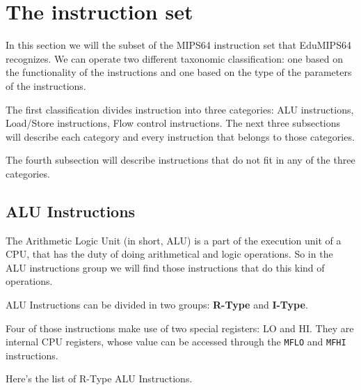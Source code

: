 \documentclass[12pt]{report}
\newcommand{\EM}{EduMIPS64}
\newcommand{\MS}{MIPS64}
\begin{document}
\chapter{The instruction set}
\label{instructions}

In this section we will the subset of the \MS{} instruction set that \EM{}
recognizes. We can operate two different taxonomic classification: one based on
the functionality of the instructions and one based on the type of the
parameters of the instructions. 


The first classification divides instruction into three categories:
ALU instructions, Load/Store instructions, Flow control instructions. The next
three subsections will describe each category and every instruction that belongs
to those categories.

The fourth subsection will describe instructions that do not fit in any of the
three categories.



\section{ALU Instructions}
The Arithmetic Logic Unit (in short, ALU) is a part of the execution unit of a
CPU, that has the duty of doing arithmetical and logic operations. So in the ALU
instructions group we will find those instructions that do this kind of
operations.

ALU Instructions can be divided in two groups: \textbf{R-Type} and
\textbf{I-Type}. 

Four of those instructions make use of two special registers: LO and HI. They
are internal CPU registers, whose value can be accessed through the
\texttt{MFLO} and \texttt{MFHI} instructions.

Here's the list of R-Type ALU Instructions.
\end{document}
